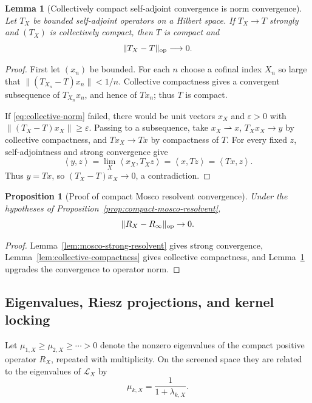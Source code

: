 \documentclass[11pt]{article}
\newtheorem{proposition}[theorem]{Proposition}
\newtheorem{lemma}[theorem]{Lemma}
\theoremstyle{definition}
\theoremstyle{remark}
\newcommand{\norm}[1]{\lVert#1\rVert}
\newcommand{\ip}[2]{\left\langle#1,#2\right\rangle}
\begin{document}
\begin{lemma}[Collectively compact self-adjoint convergence is norm convergence]
\label{lem:collective-norm}
Let $T_X$ be bounded self-adjoint operators on a Hilbert space.  If
$T_X\to T$ strongly and $(T_X)$ is collectively compact, then $T$ is compact
and
\begin{equation}
\norm{T_X-T}_{\rm op}\longrightarrow0.
\label{eq:collective-norm}
\end{equation}
\end{lemma}

\begin{proof}
First let $(x_n)$ be bounded.  For each $n$ choose a cofinal index $X_n$ so
large that $\norm{(T_{X_n}-T)x_n}<1/n$.  Collective compactness gives a
convergent subsequence of $T_{X_n}x_n$, and hence of $Tx_n$; thus $T$ is
compact.

If \eqref{eq:collective-norm} failed, there would be unit vectors $x_X$ and
$\varepsilon>0$ with $\norm{(T_X-T)x_X}\ge\varepsilon$.  Passing to a
subsequence, take $x_X\rightharpoonup x$, $T_Xx_X\to y$ by collective
compactness, and $Tx_X\to Tx$ by compactness of $T$.  For every fixed $z$,
self-adjointness and strong convergence give
\[
\ip{y}{z}
=\lim_X\ip{x_X}{T_Xz}
=\ip{x}{Tz}
=\ip{Tx}{z}.
\]
Thus $y=Tx$, so $(T_X-T)x_X\to0$, a contradiction.
\end{proof}

\begin{proposition}[Proof of compact Mosco resolvent convergence]
\label{prop:app-compact-mosco}
Under the hypotheses of
Proposition~\ref{prop:compact-mosco-resolvent},
\[
\norm{R_X-R_\infty}_{\rm op}\to0.
\]
\end{proposition}

\begin{proof}
Lemma~\ref{lem:mosco-strong-resolvent} gives strong convergence,
Lemma~\ref{lem:collective-compactness} gives collective compactness, and
Lemma~\ref{lem:collective-norm} upgrades the convergence to operator norm.
\end{proof}

\subsection{Eigenvalues, Riesz projections, and kernel locking}

Let $\mu_{1,X}\ge\mu_{2,X}\ge\cdots>0$ denote the nonzero eigenvalues of the
compact positive operator $R_X$, repeated with multiplicity.  On the screened
space they are related to the eigenvalues of $\mathscr L_X$ by
\begin{equation}
\mu_{k,X}=\frac{1}{1+\lambda_{k,X}}.
\label{eq:resolvent-spectrum-map}
\end{equation}
\end{document}
